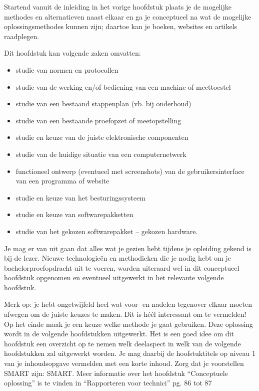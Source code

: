 Startend vanuit de inleiding in het vorige hoofdstuk plaats je de mogelijke methodes en alternatieven naast
elkaar en ga je conceptueel na wat de mogelijke oplossingsmethodes kunnen zijn; daartoe kan je boeken,
websites en artikels raadplegen.

Dit hoofdstuk kan volgende zaken omvatten:
\begin{itemize}[]
    \item studie van normen en protocollen
    \item studie van de werking en/of bediening van een machine of meettoestel
    \item studie van een bestaand stappenplan (vb. bij onderhoud)
    \item studie van een bestaande proefopzet of meetopstelling
    \item studie en keuze van de juiste elektronische componenten
    \item studie van de huidige situatie van een computernetwerk
    \item functioneel ontwerp (eventueel met screenshots) van de gebruikersinterface van een programma of website
    \item studie en keuze van het besturingssysteem
    \item studie en keuze van softwarepakketten
    \item studie van het gekozen softwarepakket – gekozen hardware.
\end{itemize}

Je mag er van uit gaan dat alles wat je gezien hebt tijdens je opleiding gekend is bij de lezer. Nieuwe
technologieën en methodieken die je nodig hebt om je bachelorproefopdracht uit te voeren, worden
uiteraard wel in dit conceptueel hoofdstuk opgenomen en eventueel uitgewerkt in het relevante volgende
hoofdstuk.

Merk op: je hebt ongetwijfeld heel wat voor- en nadelen tegenover elkaar moeten afwegen om de juiste
keuzes te maken. Dit is héél interessant om te vermelden!
Op het einde maak je een keuze welke methode je gaat gebruiken. Deze oplossing wordt in de volgende
hoofdstukken uitgewerkt. Het is een goed idee om dit hoofdstuk een overzicht op te nemen welk deelaspect
in welk van de volgende hoofdstukken zal uitgewerkt worden. Je mag daarbij de hoofstuktitels op niveau 1
van je inhoudsopgave vermelden met een korte inhoud.
Zorg dat je voorstellen \acrshort{SMART} zijn: \acrlong{SMART}.
Meer informatie over het hoofdstuk “Conceptuele oplossing” is te vinden in “Rapporteren voor technici” pg.
86 tot 87
